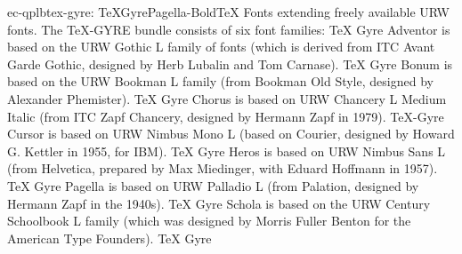 \documentclass{ddltxtyp}
\begin{document}
\begin{package}{ec-qplb}{tex-gyre: TeXGyrePagella-Bold}{{\TeX} Fonts extending freely available URW fonts.}
The {\TeX}-GYRE bundle consists of six font families: {\TeX} Gyre
Adventor is based on the URW Gothic L family of fonts (which is
derived from ITC Avant Garde Gothic, designed by Herb Lubalin
and Tom Carnase). {\TeX} Gyre Bonum is based on the URW Bookman L
family (from Bookman Old Style, designed by Alexander
Phemister). {\TeX} Gyre Chorus is based on URW Chancery L Medium
Italic (from ITC Zapf Chancery, designed by Hermann Zapf in
1979). {\TeX}-Gyre Cursor is based on URW Nimbus Mono L (based on
Courier, designed by Howard G. Kettler in 1955, for IBM). {\TeX}
Gyre Heros is based on URW Nimbus Sans L (from Helvetica,
prepared by Max Miedinger, with Eduard Hoffmann in 1957). {\TeX}
Gyre Pagella is based on URW Palladio L (from Palation,
designed by Hermann Zapf in the 1940s). {\TeX} Gyre Schola is
based on the URW Century Schoolbook L family (which was
designed by Morris Fuller Benton for the American Type
Founders). {\TeX} Gyre %
\end{package}
\end{document}
